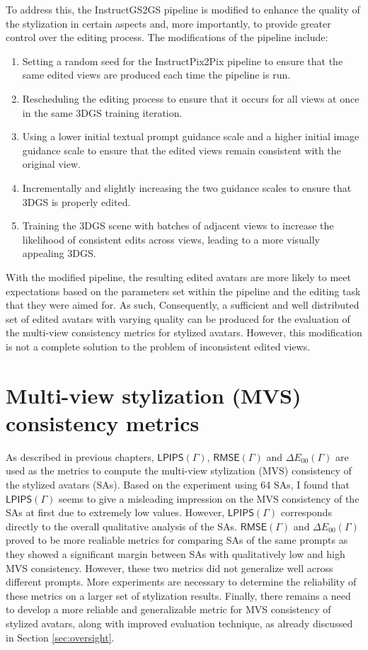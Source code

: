 To address this, the InstructGS2GS pipeline is modified to enhance the quality of the stylization in certain aspects and, more importantly, to provide greater control over the editing process. The modifications of the pipeline include:
\begin{enumerate}
    \item Setting a random seed for the InstructPix2Pix pipeline to ensure that the same edited views are produced each time the pipeline is run.
    \item Rescheduling the editing process to ensure that it occurs for all views at once in the same 3DGS training iteration.
    \item Using a lower initial textual prompt guidance scale and a higher initial image guidance scale to ensure that the edited views remain consistent with the original view.
    \item Incrementally and slightly increasing the two guidance scales to ensure that 3DGS is properly edited.
    \item Training the 3DGS scene with batches of adjacent views to increase the likelihood of consistent edits across views, leading to a more visually appealing 3DGS.
\end{enumerate}

With the modified pipeline, the resulting edited avatars are more likely to meet expectations based on the parameters set within the pipeline and the editing task that they were aimed for. As such, Consequently, a sufficient and well distributed set of edited avatars with varying quality can be produced for the evaluation of the multi-view consistency metrics for stylized avatars. However, this modification is not a complete solution to the problem of inconsistent edited views. 

\section{Multi-view stylization (MVS) consistency metrics}
As described in previous chapters, $\mathsf{LPIPS}(\varGamma)$, $\mathsf{RMSE}(\varGamma)$ and $\Delta E_{00}(\varGamma)$ are used as the metrics to compute the multi-view stylization (MVS) consistency of the stylized avatars (SAs). Based on the experiment using 64 SAs, I found that $\mathsf{LPIPS}(\varGamma)$ seems to give a misleading impression on the MVS consistency of the SAs at first due to extremely low values. However, $\mathsf{LPIPS}(\varGamma)$ corresponds directly to the overall qualitative analysis of the SAs. $\mathsf{RMSE}(\varGamma)$ and $\Delta E_{00}(\varGamma)$ proved to be more realiable metrics for comparing SAs of the same prompts as they showed a significant margin between SAs with qualitatively low and high MVS consistency. However, these two metrics did not generalize well across different prompts. More experiments are necessary to determine the reliability of these metrics on a larger set of stylization results. Finally, there remains a need to develop a more reliable and generalizable metric for MVS consistency of stylized avatars, along with improved evaluation technique, as already discussed in Section \ref{sec:oversight}.
